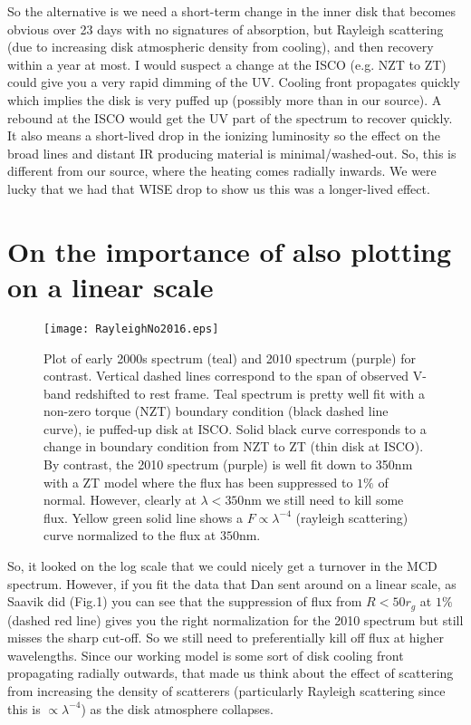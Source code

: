\documentclass[12pt]{article}
\begin{document}
So the alternative is we need a short-term change in the inner disk that becomes obvious over 23 days with no signatures of absorption, but Rayleigh scattering (due to increasing disk atmospheric density from cooling), and then recovery within a year at most. I would suspect a change at the ISCO (e.g. NZT to ZT) could give you a very rapid dimming of the UV. Cooling front propagates quickly which implies the disk is very puffed up (possibly more than in our source). A rebound at the ISCO would get the UV part of the spectrum to recover quickly. It also means a short-lived drop in the ionizing luminosity so the effect on the broad lines and distant IR producing material is minimal/washed-out. So, this is different from our source, where the heating comes radially inwards. We were lucky that we had that WISE drop to show us this was a longer-lived effect.\\


\section{On the importance of also plotting on a linear scale}

\begin{figure}
\begin{center}
\texttt{[image: RayleighNo2016.eps]}
\end{center}
\caption[cartoon]{Plot of early 2000s spectrum (teal) and 2010 spectrum (purple) for contrast. Vertical dashed lines correspond to the span of observed V-band redshifted to rest frame. Teal spectrum is pretty well fit with a non-zero torque (NZT) boundary condition (black dashed line curve), ie puffed-up disk at ISCO. Solid black curve corresponds to a change in boundary condition from NZT to ZT (thin disk at ISCO).
By contrast, the 2010 spectrum (purple) is well fit down to 350nm with a ZT model where the flux has been suppressed to $1\%$ of normal. However, clearly at $\lambda<350$nm we still need to kill some flux. Yellow green solid line shows a $F \propto \lambda^{-4}$ (rayleigh scattering) curve normalized to the flux at $350$nm. 
\label{fig:rayleigh1}}
\end{figure}

So, it looked on the log scale that we could nicely get a turnover in the MCD spectrum. However, if you fit the data that Dan sent around on a linear scale, as Saavik did (Fig.1) you can see that the suppression of flux from $R<50r_{g}$ at $1\%$ (dashed red line) gives you the right normalization for the 2010 spectrum but still misses the sharp cut-off. So we still need to preferentially kill off flux at higher wavelengths. Since our working model is some sort of disk cooling front propagating radially outwards, that made us think about the effect of scattering from increasing the density of scatterers (particularly Rayleigh scattering since this is $ \propto \lambda^{-4}$) as the disk atmosphere collapses.
\end{document}

